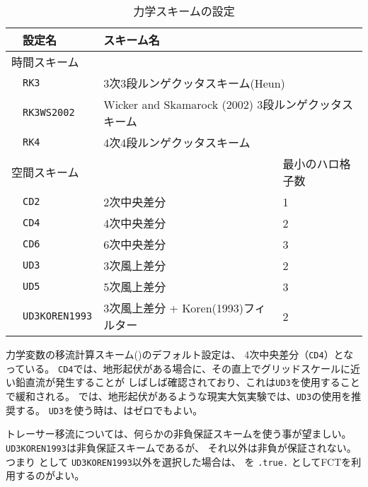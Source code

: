 \begin{table}[h]
\begin{center}
  \caption{力学スキームの設定}
  \label{tab:nml_atm_dyn}
  \begin{tabularx}{150mm}{llXX} \hline
    \rowcolor[gray]{0.9} & \multicolumn{1}{l}{設定名} & \multicolumn{1}{l}{スキーム名} & \\ \hline
    \multicolumn{3}{l}{時間スキーム} &  \\ \hline
    & \multicolumn{1}{l}{\verb|RK3|} & \multicolumn{2}{l}{3次3段ルンゲクッタスキーム(Heun)} \\
    & \multicolumn{1}{l}{\verb|RK3WS2002|} & \multicolumn{2}{l}{Wicker and Skamarock (2002) 3段ルンゲクッタスキーム} \\
    & \multicolumn{1}{l}{\verb|RK4|} & \multicolumn{2}{l}{4次4段ルンゲクッタスキーム} \\
    \hline
    \multicolumn{3}{l}{空間スキーム} & 最小のハロ格子数\\ \hline
    & \multicolumn{1}{l}{\verb|CD2|} & \multicolumn{1}{l}{2次中央差分} & \multicolumn{1}{l}{1}\\
    & \multicolumn{1}{l}{\verb|CD4|} & \multicolumn{1}{l}{4次中央差分} & \multicolumn{1}{l}{2}\\
    & \multicolumn{1}{l}{\verb|CD6|} & \multicolumn{1}{l}{6次中央差分} & \multicolumn{1}{l}{3}\\
    & \multicolumn{1}{l}{\verb|UD3|} & \multicolumn{1}{l}{3次風上差分} & \multicolumn{1}{l}{2}\\
    & \multicolumn{1}{l}{\verb|UD5|} & \multicolumn{1}{l}{5次風上差分} & \multicolumn{1}{l}{3}\\
    & \multicolumn{1}{l}{\verb|UD3KOREN1993|} & \multicolumn{1}{X}{3次風上差分 + Koren(1993)フィルター} & \multicolumn{1}{l}{2}\\
\hline
  \end{tabularx}
\end{center}
\end{table}

力学変数の移流計算スキーム()のデフォルト設定は、
4次中央差分（\verb|CD4|）となっている。
\verb|CD4|では、地形起伏がある場合に、その直上でグリッドスケールに近い鉛直流が発生することが
しばしば確認されており、これは\verb|UD3|を使用することで緩和される。
{\scalerm}では、地形起伏があるような現実大気実験では、\verb|UD3|の使用を推奨する。
\verb|UD3|を使う時は、はゼロでもよい。

トレーサー移流については、何らかの非負保証スキームを使う事が望ましい。
\verb|UD3KOREN1993|は非負保証スキームであるが、
それ以外は非負が保証されない。
つまり として \verb|UD3KOREN1993|以外を選択した場合は、
 を \verb|.true.| としてFCTを利用するのがよい。

